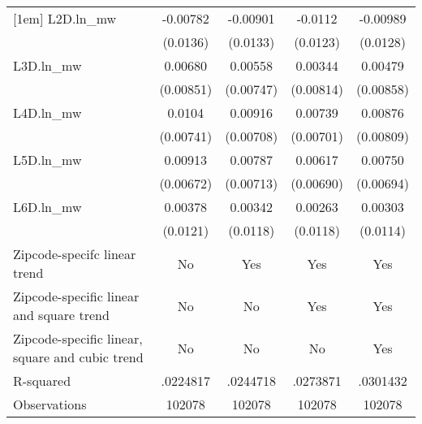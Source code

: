{\begin{tabular}{l*{4}{c}}
[1em]
L2D.ln\_mw & -0.00782         & -0.00901         &  -0.0112         & -0.00989         \\
          & (0.0136)         & (0.0133)         & (0.0123)         & (0.0128)         \\
[1em]
L3D.ln\_mw &  0.00680         &  0.00558         &  0.00344         &  0.00479         \\
          &(0.00851)         &(0.00747)         &(0.00814)         &(0.00858)         \\
[1em]
L4D.ln\_mw &   0.0104         &  0.00916         &  0.00739         &  0.00876         \\
          &(0.00741)         &(0.00708)         &(0.00701)         &(0.00809)         \\
[1em]
L5D.ln\_mw &  0.00913         &  0.00787         &  0.00617         &  0.00750         \\
          &(0.00672)         &(0.00713)         &(0.00690)         &(0.00694)         \\
[1em]
L6D.ln\_mw &  0.00378         &  0.00342         &  0.00263         &  0.00303         \\
          & (0.0121)         & (0.0118)         & (0.0118)         & (0.0114)         \\
\hline
Zipcode-specifc linear trend&       No         &      Yes         &      Yes         &      Yes         \\
Zipcode-specific linear and square trend&       No         &       No         &      Yes         &      Yes         \\
Zipcode-specific linear, square and cubic trend&       No         &       No         &       No         &      Yes         \\
R-squared & .0224817         & .0244718         & .0273871         & .0301432         \\
Observations&   102078         &   102078         &   102078         &   102078         \\
\hline\hline
\end{tabular}
}
